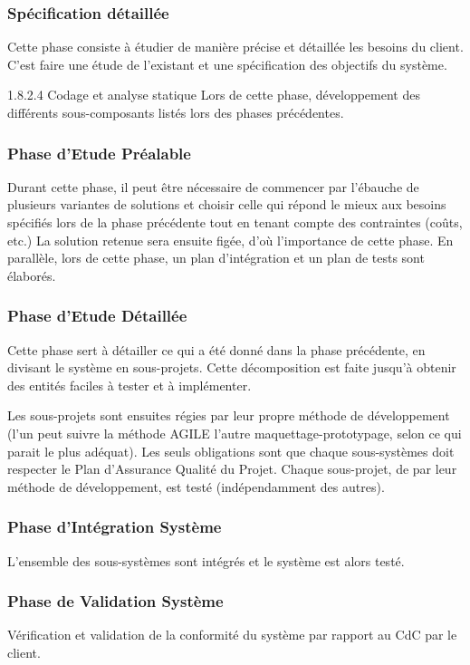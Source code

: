 \subsubsection{Spécification détaillée}
Cette phase consiste à étudier de manière précise et détaillée les besoins du client. C'est faire une étude de l'existant et une spécification des objectifs du système.

1.8.2.4   Codage et analyse statique
Lors de cette phase, développement des différents sous-composants listés lors des phases précédentes.  

    \subsubsection{Phase d’Etude Préalable}
  Durant cette phase, il peut être nécessaire de commencer par l'ébauche de plusieurs variantes de solutions et choisir celle qui répond le mieux aux besoins spécifiés lors de la phase précédente tout en tenant compte des contraintes (coûts, etc.) La solution retenue sera ensuite figée, d'où l'importance de cette phase. En parallèle, lors de cette phase, un plan d'intégration et un plan de tests sont élaborés.
    
    \subsubsection{Phase d’Etude Détaillée}
    Cette phase sert à détailler ce qui a été donné dans la phase précédente, en divisant le système en sous-projets. Cette décomposition est faite jusqu'à obtenir des entités faciles à tester et à implémenter.

    Les sous-projets sont ensuites régies par leur propre méthode de développement (l'un peut suivre la méthode AGILE l'autre maquettage-prototypage, selon ce qui parait le plus adéquat). Les seuls obligations sont que chaque sous-systèmes doit respecter le Plan d'Assurance Qualité du Projet.
    Chaque sous-projet, de par leur méthode de développement, est testé (indépendamment des autres).
    
    \subsubsection{Phase d’Intégration Système }
    L'ensemble des sous-systèmes sont intégrés et le système est alors testé.
    \subsubsection{Phase de Validation Système}
    Vérification et validation de la conformité du système par rapport au CdC par le client.
